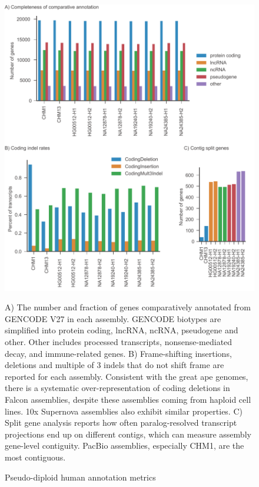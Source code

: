 \begin{figure}
\centering
\includegraphics[width=\textwidth,height=0.75\textheight,keepaspectratio]{Figure_3.pdf}
\caption{Pseudo-diploid human annotation metrics}
A) The number and fraction of genes comparatively annotated from GENCODE V27 in each assembly. GENCODE biotypes are simplified into protein coding, lncRNA, ncRNA, pseudogene and other. Other includes processed transcripts, nonsense-mediated decay, and immune-related genes. B) Frame-shifting insertions, deletions and multiple of 3 indels that do not shift frame are reported for each assembly. Consistent with the great ape genomes, there is a systematic over-representation of coding deletions in Falcon assemblies, despite these assemblies coming from haploid cell lines. 10x Supernova assemblies also exhibit similar properties. C) Split gene analysis reports how often paralog-resolved transcript projections end up on different contigs, which can measure assembly gene-level contiguity. PacBio assemblies, especially CHM1, are the most contiguous.
\label{fig:human_metrics}
\end{figure}

